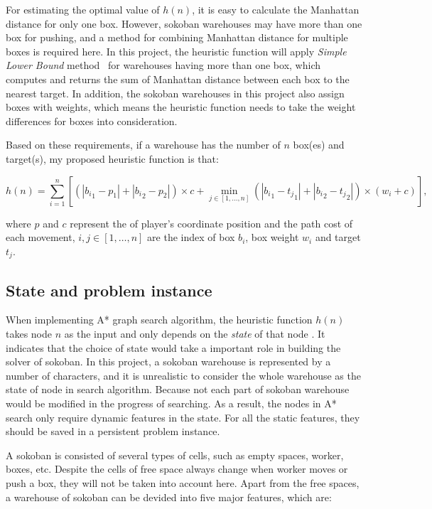 \documentclass{article}
\begin{document}
For estimating the optimal value of $h(n)$, it is easy to calculate the Manhattan distance for only one box. However, sokoban warehouses may have more than one box for pushing, and a method for combining Manhattan distance for multiple boxes is required here. In this project, the heuristic function will apply \textit{Simple Lower Bound} method~\cite{master} for warehouses having more than one box, which computes and returns the sum of Manhattan distance between each box to the nearest target. In addition, the sokoban warehouses in this project also assign boxes with weights, which means the heuristic function needs to take the weight differences for boxes into consideration. 

Based on these requirements, if a warehouse has the number of $n$ box(es) and target(s), my proposed heuristic function is that: 

\begin{equation}
    h(n)= \sum^n_{i=1} \left[ {(|{b_i}_1 - {p}_1| + |{b_i}_2 - {p}_2|) \times c} +  \min_{j\in [1,\dots,n]} {(|{b_i}_1 - {t_j}_1| + |{b_i}_2 - {t_j}_2|)\times (w_i + c)} \right],
\end{equation}

where $p$ and $c$ represent the of player's coordinate position and the path cost of each movement, $i,j \in[1,\dots,n]$ are the index of box $b_i$, box weight $w_i$ and target $t_j$.


\subsection{State and problem instance}

When implementing A* graph search algorithm, the heuristic function $h(n)$ takes node $n$ as the input and only depends on the \textit{state} of that node \cite{AIAMA}. It indicates that the choice of state would take a important role in building the solver of sokoban. In this project, a sokoban warehouse is represented by a number of characters, and it is unrealistic to consider the whole warehouse as the state of node in search algorithm. Because not each part of sokoban warehouse would be modified in the progress of searching. As a result, the nodes in A* search only require dynamic features in the state. For all the static features, they should be saved in a persistent problem instance.

A sokoban is consisted of several types of cells, such as empty spaces, worker, boxes, etc. Despite the cells of free space always change when worker moves or push a box, they will not be taken into account here. Apart from the free spaces, a warehouse of sokoban can be devided into five major features, which are:
\end{document}
